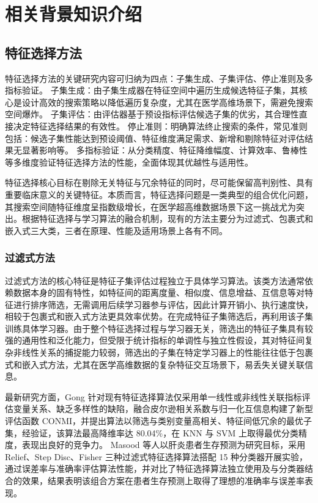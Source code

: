 \documentclass{wzuthesis}
\begin{document}
\chapter {相关背景知识介绍}
\section {特征选择方法}
特征选择方法的关键研究内容可归纳为四点：子集生成、子集评估、停止准则及多指标验证。
子集生成：由子集生成器在特征空间中遍历生成候选特征子集，其核心是设计高效的搜索策略以降低遍历复杂度，尤其在医学高维场景下，需避免搜索空间爆炸。
子集评估：由评估器基于预设指标评估候选子集的优劣，其合理性直接决定特征选择结果的有效性。
停止准则：明确算法终止搜索的条件，常见准则包括：候选子集性能达到预设阈值、特征维度满足需求、新增和剔除特征对评估结果无显著影响等。
多指标验证：从分类精度、特征降维幅度、计算效率、鲁棒性等多维度验证特征选择方法的性能，全面体现其优越性与适用性。


特征选择核心目标在剔除无关特征与冗余特征的同时，尽可能保留高判别性、具有重要临床意义的关键特征。本质而言，特征选择问题是一类典型的组合优化问题，其搜索空间随特征维度呈指数级增长，在医学超高维数据场景下这一挑战尤为突出。根据特征选择与学习算法的融合机制，现有的方法主要分为过滤式、包裹式和嵌入式三大类，三者在原理、性能及适用场景上各有不同。


\subsection{过滤式方法}
过滤式方法的核心特征是特征子集评估过程独立于具体学习算法。该类方法通常依赖数据本身的固有特性，如特征间的距离度量、相似度、信息增益、互信息等对特征进行排序筛选，无需调用后续学习器参与评估，因此计算开销小、执行速度快，相较于包裹式和嵌入式方法更具效率优势。在完成特征子集筛选后，再利用该子集训练具体学习器。由于整个特征选择过程与学习器无关，筛选出的特征子集具有较强的通用性和泛化能力，但受限于统计指标的单调性与独立性假设，其对特征间复杂非线性关系的捕捉能力较弱，筛选出的子集在特定学习器上的性能往往低于包裹式和嵌入式方法，尤其在医学高维数据的复杂特征交互场景下，易丢失关键关联信息。

最新研究方面，Gong 针对现有特征选择算法仅采用单一线性或非线性关联指标评估变量关系、缺乏多样性的缺陷，融合皮尔逊相关系数与归一化互信息构建了新型评估函数 CONMI，并提出算法以筛选与类别变量高相关、特征间低冗余的最优子集，经验证，该算法最高降维率达 80.04\%，在 KNN 与 SVM 上取得最优分类精度，表现出良好的竞争力。
Masood 等人以肝炎患者生存预测为研究目标，采用 Relief、Step Disc、Fisher 三种过滤式特征选择算法搭配 15 种分类器开展实验，通过误差率与准确率评估算法性能，并对比了特征选择算法独立使用及与分类器结合的效果，结果表明该组合方案在患者生存预测上取得了理想的准确率与误差率表现。
\end{document}

